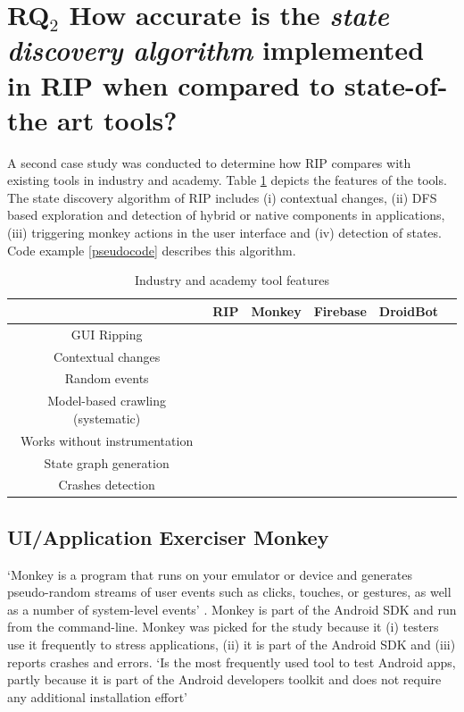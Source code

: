 \section{\textbf{RQ$_2$} How accurate is the \textit{state discovery algorithm} implemented in RIP when compared to state-of-the art tools?}

A second case study was conducted to determine how RIP compares with existing tools in industry and academy. Table \ref{tools}  depicts the features of the tools. The state discovery algorithm of RIP includes (i) contextual changes, (ii) DFS based exploration and detection of hybrid or native components in applications, (iii) triggering monkey actions in the user interface and (iv) detection of states. Code example \ref{pseudocode} describes this algorithm.%

\begin{table}[h]
	\centering
	\caption{Industry and academy tool features}
	\label{tools}
	\begin{adjustbox}{width=0.8\textwidth}
		\begin{tabular}{|c|c|c|c|c|c|}
			\hline
			&\textbf{RIP}&\textbf{Monkey}&\textbf{Firebase}&\textbf{DroidBot}\\\hline
			GUI Ripping&\checkmark&&\checkmark&\checkmark\\\hline
			Contextual changes&\checkmark&&&\\\hline
			Random events&\checkmark&\checkmark&\checkmark&\checkmark\\\hline
			Model-based crawling (systematic)&\checkmark&&\checkmark&\checkmark\\\hline
			Works without instrumentation&\checkmark&\checkmark&\checkmark&\checkmark\\\hline
			State graph generation&\checkmark&&\checkmark&\checkmark\\\hline
			Crashes detection&\checkmark&&\checkmark&\\\hline
		\end{tabular}
	\end{adjustbox}
\end{table}

\subsection{UI/Application Exerciser Monkey}

`Monkey is a program that runs on your emulator or device and generates pseudo-random streams of user events such as clicks, touches, or gestures, as well as a number of system-level events' \cite{monkey}. Monkey is part of the Android SDK and run from the command-line. Monkey was picked for the study because it (i) testers use it frequently to stress applications, (ii) it is part of the Android SDK and (iii) reports crashes and errors. `Is the most frequently used tool to test Android apps, partly because it is part of the Android developers toolkit and does not require any additional installation effort' \cite{Choudhary:ASE15}

